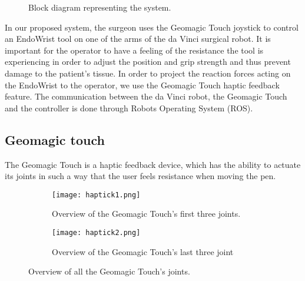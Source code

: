 {\begin{figure}[h]
\centering
{}
\caption{Block diagram representing the system.}
\end{figure}


In our proposed system, the surgeon uses the Geomagic Touch joystick to control an EndoWrist tool on one of the arms of the da Vinci surgical robot.
It is important for the operator to have a feeling of the resistance the tool is experiencing in order to adjust the position and grip strength and thus prevent damage to the patient's tissue.
In order to project the reaction forces acting on the EndoWrist to the operator, we use the Geomagic Touch haptic feedback feature. The communication between the da Vinci robot, the Geomagic Touch and the controller is done through Robots Operating System (ROS).

}

\subsection{Geomagic touch}\label{sec:Geomagic_touch}
The Geomagic Touch is a haptic feedback device, which has the ability to actuate its joints in such a way that the user feels resistance when moving the pen. 


\begin{figure}[h]
  \centering
  \begin{subfigure}{.22\textwidth}
    \centering
    \texttt{[image: haptick1.png]}
    \caption{Overview of the Geomagic Touch's first three joints.}
    \label{fig:phantom1}
  \end{subfigure}
  \begin{subfigure}{.22\textwidth}
    \centering
    \texttt{[image: haptick2.png]}
    \caption{Overview of the Geomagic Touch's last three joint}
    \label{fig:phantom2}
  \end{subfigure}
\caption{Overview of all the Geomagic Touch's joints.}
\label{fig:phantom_omni}
\end{figure}


